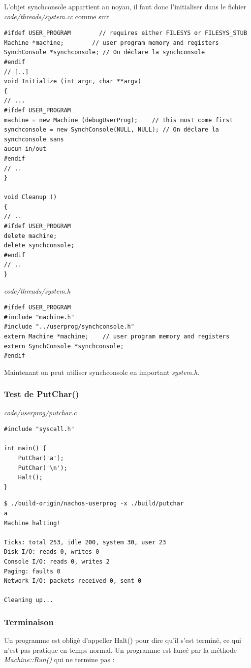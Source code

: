 \documentclass[a4paper,10pt]{article}
\begin{document}
L'objet synchconsole appartient au noyau, il faut donc l'initialiser dans le
fichier \textit{code/threads/system.cc} comme suit

\begin{lstlisting}
#ifdef USER_PROGRAM        // requires either FILESYS or FILESYS_STUB
Machine *machine;        // user program memory and registers
SynchConsole *synchconsole; // On déclare la synchconsole
#endif
// [..]
void Initialize (int argc, char **argv)
{
// ...
#ifdef USER_PROGRAM
machine = new Machine (debugUserProg);    // this must come first
synchconsole = new SynchConsole(NULL, NULL); // On déclare la synchconsole sans
aucun in/out
#endif
// ..
}

void Cleanup ()
{
// ..
#ifdef USER_PROGRAM
delete machine;
delete synchconsole;
#endif
// ..
}
\end{lstlisting}

\textit{code/threads/system.h}
\begin{lstlisting}
#ifdef USER_PROGRAM
#include "machine.h"
#include "../userprog/synchconsole.h"
extern Machine *machine;    // user program memory and registers
extern SynchConsole *synchconsole;
#endif
\end{lstlisting}

Maintenant on peut utiliser synchconsole en important \textit{system.h}.

\subsubsection{Test de PutChar()}

\textit{code/userprog/putchar.c}
\begin{lstlisting}
#include "syscall.h"

int main() {
    PutChar('a');
    PutChar('\n');
    Halt();
}
\end{lstlisting}

\begin{lstlisting}
$ ./build-origin/nachos-userprog -x ./build/putchar
a
Machine halting!

Ticks: total 253, idle 200, system 30, user 23
Disk I/O: reads 0, writes 0
Console I/O: reads 0, writes 2
Paging: faults 0
Network I/O: packets received 0, sent 0

Cleaning up...
\end{lstlisting}

\subsubsection{Terminaison}
Un programme est obligé d'appeller Halt() pour dire qu'il s'est terminé, ce qui
n'est pas pratique en temps normal. Un programme est lancé par la méthode
\textit{Machine::Run()} qui ne termine pas :
\end{document}
